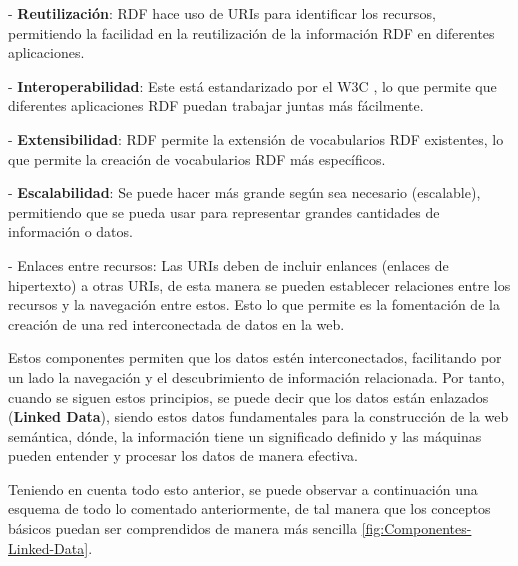 \documentclass[11pt]{report}
\begin{document}
\indent \indent \indent - \textbf{Reutilización}: RDF hace uso de URIs para identificar los recursos, permitiendo la facilidad en la reutilización de la información RDF en diferentes aplicaciones.

\indent \indent \indent - \textbf{Interoperabilidad}: Este está estandarizado por el W3C \cite{5}, lo que permite que diferentes aplicaciones RDF puedan trabajar juntas más fácilmente.

\indent \indent \indent - \textbf{Extensibilidad}: RDF permite la extensión de vocabularios RDF existentes, lo que permite la creación de vocabularios RDF más específicos.

\indent \indent \indent - \textbf{Escalabilidad}: Se puede hacer más grande según sea necesario (escalable),  permitiendo que se pueda usar para representar grandes cantidades de información o datos.

- Enlaces entre recursos: Las URIs deben de incluir enlances (enlaces de hipertexto) a otras URIs, de esta manera se pueden establecer relaciones entre los recursos y la navegación entre estos. Esto lo que permite es la fomentación de la creación de una red interconectada de datos en la web.

Estos componentes permiten que los datos estén interconectados, facilitando por un lado la navegación y el descubrimiento de información relacionada. Por tanto, cuando se siguen estos principios, se puede decir que los datos están enlazados (\textbf{Linked Data}), siendo estos datos fundamentales para la construcción de la web semántica, dónde, la información tiene un significado definido y las máquinas pueden entender y procesar los datos de manera efectiva.

Teniendo en cuenta todo esto anterior, se puede observar a continuación una esquema de todo lo comentado anteriormente, de tal manera que los conceptos básicos puedan ser comprendidos de manera más sencilla \ref{fig:Componentes-Linked-Data}.
\end{document}
